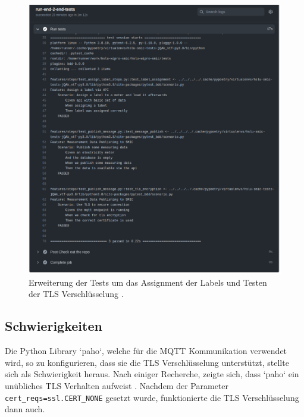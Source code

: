 \begin{figure}[h]
    \centering
    \includegraphics[width=1.0\textwidth]{gfx/testlog-iteration-2}
    \caption{
        Erweiterung der Tests um das Assignment der Labels und Testen der \ac{TLS} Verschlüsselung \parencite{randombenj_testlog_it_2_2021}.
    }
    \label{fig:test-iteration-3}
\end{figure}

\subsection{Schwierigkeiten}
Die Python Library `paho`, welche für die \ac{MQTT} Kommunikation verwendet wird, so zu konfigurieren, 
dass sie die \ac{TLS} Verschlüsselung unterstützt, stellte sich als Schwierigkeit heraus.
Nach einiger Recherche, zeigte sich, dass `paho` ein unübliches \ac{TLS}
Verhalten aufweist \parencite{eclipse_paho_ssl_2019}.
Nachdem der Parameter \texttt{cert\_reqs=ssl.CERT\_NONE} gesetzt wurde, funktionierte
die \ac{TLS} Verschlüsselung dann auch.